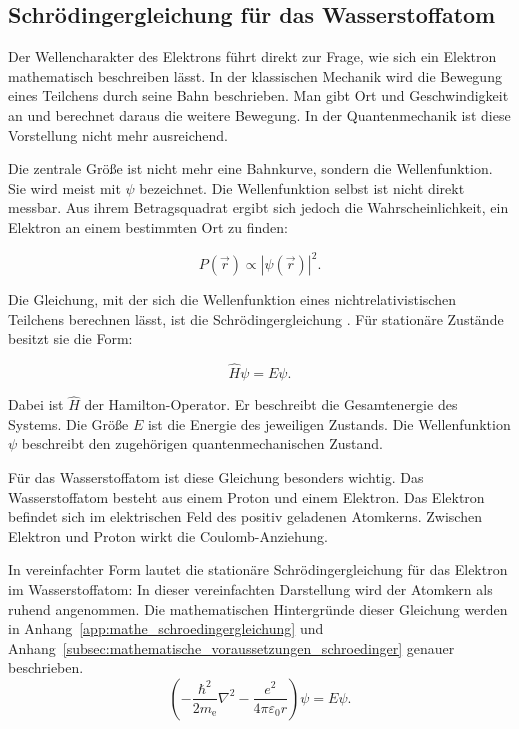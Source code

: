 \subsection{Schrödingergleichung für das Wasserstoffatom}
\label{subsec:schroedingergleichung_wasserstoffatom}

Der Wellencharakter des Elektrons führt
direkt zur Frage, wie sich ein Elektron mathematisch beschreiben
lässt. In der klassischen Mechanik wird die Bewegung eines Teilchens durch seine
Bahn beschrieben. Man gibt Ort und Geschwindigkeit an und berechnet daraus die
weitere Bewegung. In der Quantenmechanik ist diese
Vorstellung nicht mehr ausreichend.

Die zentrale Größe ist nicht mehr eine Bahnkurve, sondern die
Wellenfunktion. Sie wird meist mit \(\psi\) bezeichnet.
Die Wellenfunktion selbst ist nicht direkt messbar. Aus ihrem Betragsquadrat
ergibt sich jedoch die Wahrscheinlichkeit, ein
Elektron an einem bestimmten Ort zu finden:

\begin{equation}
	P(\vec r) \propto |\psi(\vec r)|^2 .
	\label{eq:wahrscheinlichkeit_psi_quadrat}
\end{equation}

Die Gleichung, mit der sich die Wellenfunktion eines nichtrelativistischen
Teilchens berechnen lässt, ist die Schrödingergleichung
. Für stationäre Zustände besitzt sie die Form:

\begin{equation}
	\hat{H}\psi = E\psi .
	\label{eq:stationaere_schroedingergleichung}
\end{equation}

Dabei ist \(\hat{H}\) der Hamilton-Operator. Er
beschreibt die Gesamtenergie des Systems. Die Größe \(E\) ist
die Energie des jeweiligen Zustands. Die Wellenfunktion \(\psi\) beschreibt den
zugehörigen quantenmechanischen Zustand.

Für das Wasserstoffatom ist diese Gleichung besonders
wichtig. Das Wasserstoffatom besteht aus einem Proton und einem
Elektron. Das Elektron befindet sich im elektrischen Feld des positiv geladenen
Atomkerns. Zwischen Elektron und Proton wirkt die
Coulomb-Anziehung.

In vereinfachter Form lautet die stationäre Schrödingergleichung für das
Elektron im Wasserstoffatom:
In dieser vereinfachten Darstellung wird der Atomkern als ruhend angenommen.
Die mathematischen Hintergründe dieser Gleichung werden in
Anhang~\ref{app:mathe_schroedingergleichung} und Anhang~\ref{subsec:mathematische_voraussetzungen_schroedinger}  genauer beschrieben.
\begin{equation}
	\left(
	-\frac{\hbar^2}{2m_\mathrm{e}}\nabla^2
	-\frac{e^2}{4\pi\varepsilon_0 r}
	\right)\psi
	=
	E\psi .
	\label{eq:schroedingergleichung_wasserstoff}
\end{equation}

